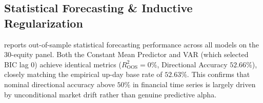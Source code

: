 \documentclass[10pt,twocolumn,a4paper]{article}
\begin{document}
\begin{table}[t]
\caption{Reconciled cost-aware dollar-neutral quintile backtest on the 30-asset panel (seeds 42, 123, 999). Daily rebalancing across top 6 long and bottom 6 short equities under institutional transaction frictions.}
\label{tab:backtest30}
\vskip 0.05in
\centering
\small
\renewcommand{\arraystretch}{1.20}
\end{table}

\subsection{Statistical Forecasting \& Inductive Regularization}
 reports out-of-sample statistical forecasting performance across all models on the 30-equity panel. Both the Constant Mean Predictor and VAR (which selected BIC lag 0) achieve identical metrics ($R^2_{\mathrm{OOS}} = 0\%$, Directional Accuracy $52.66\%$), closely matching the empirical up-day base rate of $52.63\%$. This confirms that nominal directional accuracy above $50\%$ in financial time series is largely driven by unconditional market drift rather than genuine predictive alpha.
\end{document}
